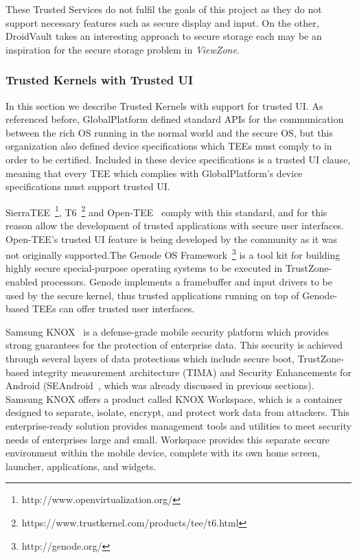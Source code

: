 These Trusted Services do not fulfil the goals of this project as they do not support necessary features such as secure display and input. On the other, DroidVault takes an interesting approach to secure storage each may be an inspiration for the secure storage problem in \emph{ViewZone}.

\subsubsection{Trusted Kernels with Trusted UI}

In this section we describe Trusted Kernels with support for trusted UI. As referenced before, GlobalPlatform defined standard APIs for the communication between the rich OS running in the normal world and the secure OS, but this organization also defined device specifications which TEEs must comply to in order to be certified. Included in these device specifications is a trusted UI clause, meaning that every TEE which complies with GlobalPlatform's device specifications must support trusted UI. 

SierraTEE~\footnote{http://www.openvirtualization.org/}, T6~\footnote{https://www.trustkernel.com/products/tee/t6.html} and Open-TEE~\cite{mcgillion2015open} comply with this standard, and for this reason allow the development of trusted applications with secure user interfaces. Open-TEE's trusted UI feature is being developed by the community as it was not originally supported.The Genode OS Framework~\footnote{http://genode.org/} is a tool kit for building highly secure special-purpose operating systems to be executed in TrustZone-enabled processors. Genode implements a framebuffer and input drivers to be used by the secure kernel, thus trusted applications running on top of Genode-based TEEs can offer trusted user interfaces.

Samsung KNOX~\cite{knox_whitepaper} is a defense-grade mobile security platform which provides strong guarantees for the protection of enterprise data. This security is achieved through several layers of data protections which include secure boot, TrustZone-based integrity measurement architecture (TIMA) and Security Enhancements for Android (SEAndroid~\cite{smalley2013security}, which was already discussed in previous sections). Samsung KNOX offers a product called KNOX Workspace, which is a container designed to separate, isolate, encrypt, and protect work data from attackers. This enterprise-ready solution provides management tools and utilities to meet security needs of enterprises large and small. Workspace provides this separate secure environment within the mobile device, complete with its own home screen, launcher, applications, and widgets.

